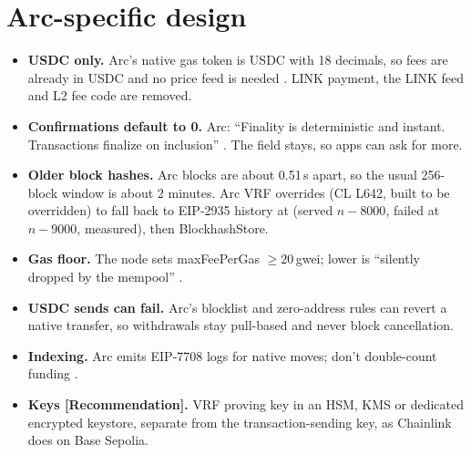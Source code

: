 \documentclass[11pt,a4paper]{article}
\begin{document}
\section{Arc-specific design}
\begin{itemize}
  \item \textbf{USDC only.} Arc's native gas token is USDC with 18 decimals, so fees are already in USDC and no price feed is needed \cite{arcevm}. LINK payment, the LINK feed and L2 fee code are removed.
  \item \textbf{Confirmations default to 0.} Arc: ``Finality is deterministic and instant. Transactions finalize on inclusion'' \cite{arcfinality}. The field stays, so apps can ask for more.
  \item \textbf{Older block hashes.} Arc blocks are about 0.51\,s apart, so the usual 256-block window is about 2 minutes. Arc VRF overrides  (CL L642, built to be overridden) to fall back to EIP-2935 history at  (served $n-8000$, failed at $n-9000$, measured), then BlockhashStore.
  \item \textbf{Gas floor.} The node sets maxFeePerGas $\ge 20$\,gwei; lower is ``silently dropped by the mempool'' \cite{arcevm}.
  \item \textbf{USDC sends can fail.} Arc's blocklist and zero-address rules can revert a native transfer, so withdrawals stay pull-based and never block cancellation.
  \item \textbf{Indexing.} Arc emits EIP-7708  logs for native moves; don't double-count funding \cite{arcindex}.
  \item \textbf{Keys [Recommendation].} VRF proving key in an HSM, KMS or dedicated encrypted keystore, separate from the transaction-sending key, as Chainlink does on Base Sepolia.
\end{itemize}

\end{document}
